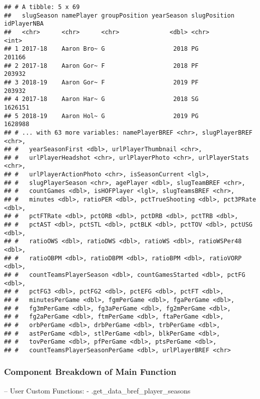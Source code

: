 \documentclass[]{article}
\begin{document}
\begin{verbatim}
## # A tibble: 5 x 69
##   slugSeason namePlayer groupPosition yearSeason slugPosition idPlayerNBA
##   <chr>      <chr>      <chr>              <dbl> <chr>              <int>
## 1 2017-18    Aaron Bro~ G                   2018 PG                201166
## 2 2017-18    Aaron Gor~ F                   2018 PF                203932
## 3 2018-19    Aaron Gor~ F                   2019 PF                203932
## 4 2017-18    Aaron Har~ G                   2018 SG               1626151
## 5 2018-19    Aaron Hol~ G                   2019 PG               1628988
## # ... with 63 more variables: namePlayerBREF <chr>, slugPlayerBREF <chr>,
## #   yearSeasonFirst <dbl>, urlPlayerThumbnail <chr>,
## #   urlPlayerHeadshot <chr>, urlPlayerPhoto <chr>, urlPlayerStats <chr>,
## #   urlPlayerActionPhoto <chr>, isSeasonCurrent <lgl>,
## #   slugPlayerSeason <chr>, agePlayer <dbl>, slugTeamBREF <chr>,
## #   countGames <dbl>, isHOFPlayer <lgl>, slugTeamsBREF <chr>,
## #   minutes <dbl>, ratioPER <dbl>, pctTrueShooting <dbl>, pct3PRate <dbl>,
## #   pctFTRate <dbl>, pctORB <dbl>, pctDRB <dbl>, pctTRB <dbl>,
## #   pctAST <dbl>, pctSTL <dbl>, pctBLK <dbl>, pctTOV <dbl>, pctUSG <dbl>,
## #   ratioOWS <dbl>, ratioDWS <dbl>, ratioWS <dbl>, ratioWSPer48 <dbl>,
## #   ratioOBPM <dbl>, ratioDBPM <dbl>, ratioBPM <dbl>, ratioVORP <dbl>,
## #   countTeamsPlayerSeason <dbl>, countGamesStarted <dbl>, pctFG <dbl>,
## #   pctFG3 <dbl>, pctFG2 <dbl>, pctEFG <dbl>, pctFT <dbl>,
## #   minutesPerGame <dbl>, fgmPerGame <dbl>, fgaPerGame <dbl>,
## #   fg3mPerGame <dbl>, fg3aPerGame <dbl>, fg2mPerGame <dbl>,
## #   fg2aPerGame <dbl>, ftmPerGame <dbl>, ftaPerGame <dbl>,
## #   orbPerGame <dbl>, drbPerGame <dbl>, trbPerGame <dbl>,
## #   astPerGame <dbl>, stlPerGame <dbl>, blkPerGame <dbl>,
## #   tovPerGame <dbl>, pfPerGame <dbl>, ptsPerGame <dbl>,
## #   countTeamsPlayerSeasonPerGame <dbl>, urlPlayerBREF <chr>
\end{verbatim}

\subsubsection{Component Breakdown of Main
Function}\label{component-breakdown-of-main-function}

-- User Custom Functions: - .get\_data\_bref\_player\_seasons
\end{document}
